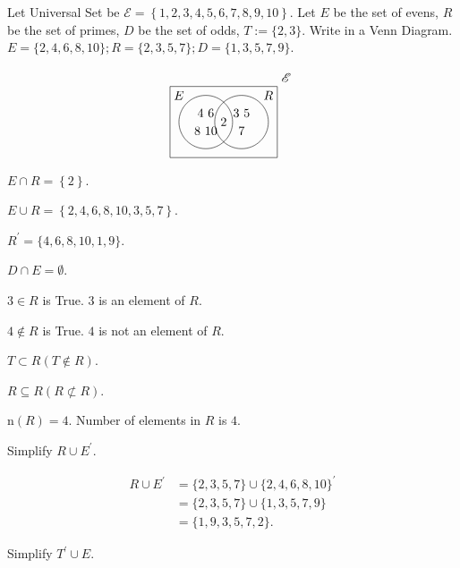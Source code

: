 \documentclass[8pt]{article}
\begin{document}
		\exmp Let Universal Set be \(\mathscr{E} = \left\{1, 2, 3, 4, 5, 6, 7, 8, 9, 10\right\}\). Let \(E\) be the set of evens, \(R\) be the set of primes, \(D\) be the set of odds, \(T := \{2, 3\}\). Write in a Venn Diagram. \(E = \{2, 4, 6, 8, 10\}; R = \{2, 3, 5, 7\}; D = \{1, 3, 5, 7, 9\}\).

		\[
		\begin{tikzpicture}
			\draw[black] (0, 0)--(3, 0)--(3, 2)--(0, 2)--(0, 0);
			\draw[black] (1, 1) circle [radius = 0.75];
			\draw[black] (2, 1) circle [radius = 0.75];
			\node at (1.5, 1) {\(2\)};
			\node at (1, 1.25) {\(4\ 6\)};
			\node at (1, 0.75) {\(8\ 10\)};
			\node at (2, 1.25) {\(3\ 5\)};
			\node at (2, 0.75) {\(7\)};
			\node at (0.25, 1.75) {\(E\)};
			\node at (2.75, 1.75) {\(R\)};
			\node at (3.25, 2.25) {\(\mathscr{E}\)};
		\end{tikzpicture}
		\]

		\exmp {} \(E\cap R = \left\{2\right\}\).

		\exmp {} \(E \cup R = \left\{2, 4, 6, 8, 10, 3, 5, 7\right\}\).

		\exmp {} \(R^{\prime} = \{4, 6, 8, 10, 1, 9\}\).

		\exmp {} \(D \cap E = \emptyset\).

		\exmp {} \(3 \in R\) is True. \(3\) is an element of \(R\).

		\exmp {} \(4 \notin R\) is True. \(4\) is not an element of \(R\).

		\exmp {} \(T \subset R (T \notin R)\).

		\exmp {} \(R \subseteq R (R \not \subset R)\).

		\exmp {} \(\mathrm{n}(R) = 4\). Number of elements in \(R\) is \(4\).\newline

		\prob Simplify \(R \cup E^{\prime}\).
		
		\solution
		
		\begin{align*}
			R \cup E^{\prime} &= \{2, 3, 5, 7\} \cup \{2, 4, 6, 8, 10\}^{\prime}\\
			&= \{2, 3, 5, 7\} \cup \{1, 3, 5, 7, 9\}\\
			&= \{1, 9, 3, 5, 7, 2\}.
		\end{align*}

		\prob Simplify \(T^{\prime} \cup E\).
		
\end{document}

